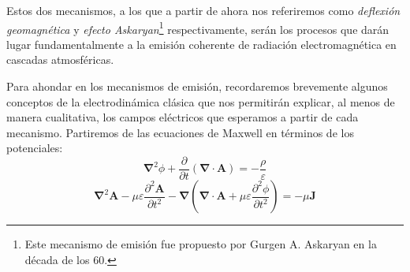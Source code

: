 \documentclass[12 pt, a4paper]{article} %
\numberwithin{equation}{section}
\numberwithin{figure}{section}
\numberwithin{table}{section}
\newcommand{\vect}[1]{\boldsymbol{\mathbf{#1}}}
\begin{document}
Estos dos mecanismos, a los que a partir de ahora nos referiremos como \textit{deflexión geomagnética} y \textit{efecto Askaryan}\footnote{ Este mecanismo de emisión fue propuesto por Gurgen A. Askaryan en la década de los 60.} respectivamente, serán los procesos que darán lugar fundamentalmente a la emisión coherente de radiación electromagnética en cascadas atmosféricas.

Para ahondar en los mecanismos de emisión, recordaremos brevemente algunos conceptos de la electrodinámica clásica que nos permitirán explicar, al menos de manera cualitativa, los campos eléctricos que esperamos a partir de cada mecanismo. Partiremos de las ecuaciones de Maxwell en términos de los potenciales:
	\begin{equation}
	\vect{\nabla}^2\phi+\frac{\partial}{\partial t}\left(\vect{\nabla}\cdot\vect{A}\right)=-\frac{\rho}{\varepsilon}\label{ec31}
	\end{equation}
	\begin{equation}
	\vect{\nabla}^2\vect{A}-\mu\varepsilon\frac{\partial^2\vect{A}}{\partial t^2}-\vect{\nabla}\left(\vect{\nabla}\cdot\vect{A}+\mu\varepsilon\frac{\partial^2\phi}{\partial t^2}\right)=-\mu\vect{J}\label{ec32}
	\end{equation}
\end{document}
